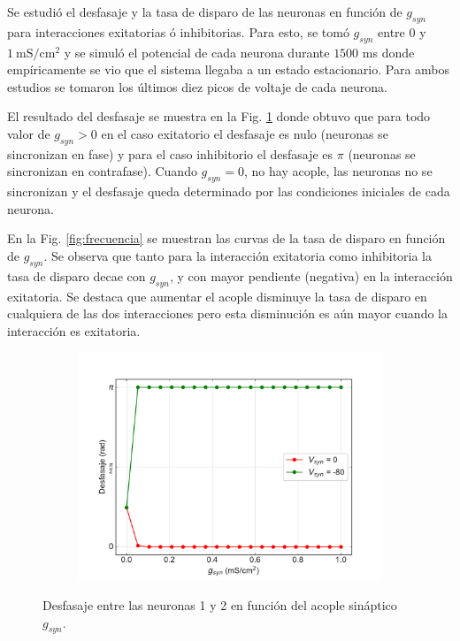 \documentclass[11pt,twocolumn,twoside]{opticajnl}
\begin{document}
Se estudió el desfasaje y la tasa de disparo de las neuronas en función de $g_{syn}$ para interacciones exitatorias ó inhibitorias. Para esto, se tomó $g_{syn}$ entre $0$ y $1 ~ \text{mS}/\text{cm}^2$ y se simuló el potencial de cada neurona durante $1500$ ms donde empíricamente se vio que el sistema llegaba a un estado estacionario. Para ambos estudios se tomaron los últimos diez picos de voltaje de cada neurona. 

El resultado del desfasaje se muestra en la Fig. \ref{fig:desfasaje} donde obtuvo que para todo valor de $g_{syn}>0$ en el caso exitatorio el desfasaje es nulo (neuronas se sincronizan en fase) y para el caso inhibitorio el desfasaje es $\pi$ (neuronas se sincronizan en contrafase). Cuando $g_{syn} = 0$, no hay acople, las neuronas no se sincronizan y el desfasaje queda determinado por las condiciones iniciales de cada neurona.

En la Fig. \ref{fig:frecuencia} se muestran las curvas de la tasa de disparo en función de $g_{syn}$. Se observa que tanto para la interacción exitatoria como inhibitoria la tasa de disparo decae con $g_{syn}$, y con mayor pendiente (negativa) en la interacción exitatoria. Se destaca que aumentar el acople disminuye la tasa de disparo en cualquiera de las dos interacciones pero esta disminución es aún mayor cuando la interacción es exitatoria.

\begin{figure}[ht]
    \centering
         \begin{subfigure}[b]{\linewidth}
            \includegraphics[width=\textwidth]{Figuras/desfasaje_vs_gsyn.pdf}
         \end{subfigure}
    \caption{Desfasaje entre las neuronas 1 y 2 en función del acople sináptico $g_{syn}$.} 
    \label{fig:desfasaje}
\end{figure}
\end{document}
